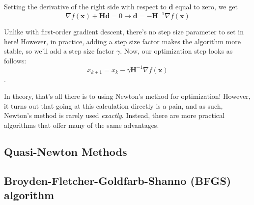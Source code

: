 \documentclass[12pt]{article}
\begin{document}
Setting the derivative of the right side with respect to \(\mathbf{d}\) equal to zero, we get 
\[\nabla f(\mathbf{x}) + \mathbf{Hd} = 0 \to \mathbf{d} = -\mathbf{H}^{-1} \nabla f(\mathbf{x})\]

Unlike with first-order gradient descent, there's no step size parameter to set in here! However, in practice,
adding a step size factor makes the algorithm more stable, so we'll add a step size factor $\gamma$. Now, our optimization step looks
as follows:
\[x_{k+1} = x_{k} - \gamma \mathbf{H}^{-1} \nabla f(\mathbf{x})\].

In theory, that's all there is to using Newton's method for optimization! However, it turns out that going at this calculation directly
is a pain, and as such, Newton's method is rarely used \textit{exactly}. Instead, there are more practical algorithms
that offer many of the same advantages.


\subsection{Quasi-Newton Methods}


\subsection{Broyden-Fletcher-Goldfarb-Shanno (BFGS) algorithm}
\end{document}
